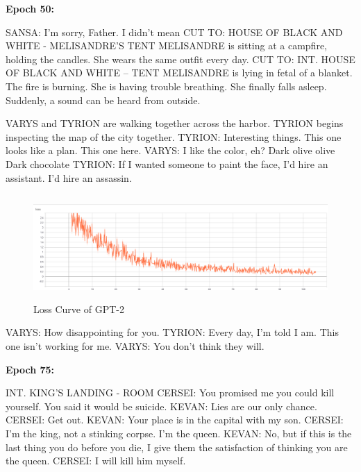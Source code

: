 \documentclass[11pt,a4paper]{article}
\begin{document}
\textbf{Epoch 50:}\newline 

SANSA: I'm sorry, Father. I didn't mean\newline 
CUT TO: HOUSE OF BLACK AND WHITE - MELISANDRE'S TENT\newline 
MELISANDRE is sitting at a campfire, holding the candles. She wears the same outfit every day.\newline 
CUT TO: INT. HOUSE OF BLACK AND WHITE – TENT\newline 
MELISANDRE is lying in fetal of a blanket. The fire is burning. She is having trouble breathing. She finally falls asleep. Suddenly, a sound can be heard from outside.\newline 

VARYS and TYRION are walking together across the harbor. TYRION begins inspecting the map of the city together.\newline 
TYRION: Interesting things. This one looks like a plan. This one here.\newline
VARYS: I like the color, eh? Dark olive olive Dark chocolate\newline 
TYRION: If I wanted someone to paint the face, I'd hire an assistant. I'd hire an assassin.\newline 

\begin{figure}[h]
\includegraphics[width=1.0\linewidth,height=4cm]{GPTLoss.PNG}
\caption{Loss Curve of GPT-2}
\end{figure}

VARYS: How disappointing for you.\newline 
TYRION: Every day, I'm told I am. This one isn't working for me.\newline 
VARYS: You don't think they will.\newline 


\textbf{Epoch 75:}\newline 

INT. KING’S LANDING - ROOM\newline 
CERSEI: You promised me you could kill yourself. You said it would be suicide.\newline 
KEVAN: Lies are our only chance.\newline 
CERSEI: Get out.\newline 
KEVAN: Your place is in the capital with my son.\newline 
CERSEI: I’m the king, not a stinking corpse. I’m the queen.\newline 
KEVAN: No, but if this is the last thing you do before you die, I give them the satisfaction of thinking you are the queen.\newline 
CERSEI: I will kill him myself.\newline 
\end{document}
